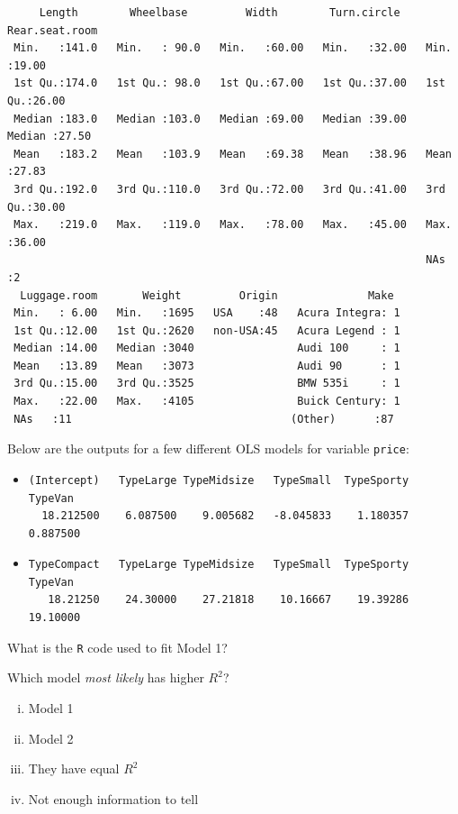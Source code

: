 \documentclass[12pt]{article}
\begin{document}
\begin{lstlisting}
     Length        Wheelbase         Width        Turn.circle    Rear.seat.room 
 Min.   :141.0   Min.   : 90.0   Min.   :60.00   Min.   :32.00   Min.   :19.00  
 1st Qu.:174.0   1st Qu.: 98.0   1st Qu.:67.00   1st Qu.:37.00   1st Qu.:26.00  
 Median :183.0   Median :103.0   Median :69.00   Median :39.00   Median :27.50  
 Mean   :183.2   Mean   :103.9   Mean   :69.38   Mean   :38.96   Mean   :27.83  
 3rd Qu.:192.0   3rd Qu.:110.0   3rd Qu.:72.00   3rd Qu.:41.00   3rd Qu.:30.00  
 Max.   :219.0   Max.   :119.0   Max.   :78.00   Max.   :45.00   Max.   :36.00  
                                                                 NAs   :2      
  Luggage.room       Weight         Origin              Make   
 Min.   : 6.00   Min.   :1695   USA    :48   Acura Integra: 1  
 1st Qu.:12.00   1st Qu.:2620   non-USA:45   Acura Legend : 1  
 Median :14.00   Median :3040                Audi 100     : 1  
 Mean   :13.89   Mean   :3073                Audi 90      : 1  
 3rd Qu.:15.00   3rd Qu.:3525                BMW 535i     : 1  
 Max.   :22.00   Max.   :4105                Buick Century: 1  
 NAs   :11                                  (Other)      :87 
\end{lstlisting}


Below are the outputs for a few different OLS models for variable \texttt{price}:

\begin{itemize}
\item[\fbox{Model 1}]

\begin{verbatim}
(Intercept)   TypeLarge TypeMidsize   TypeSmall  TypeSporty     TypeVan 
  18.212500    6.087500    9.005682   -8.045833    1.180357    0.887500 
\end{verbatim}
\item[\fbox{Model 2}]
\begin{verbatim}
TypeCompact   TypeLarge TypeMidsize   TypeSmall  TypeSporty     TypeVan 
   18.21250    24.30000    27.21818    10.16667    19.39286    19.10000
\end{verbatim}
\end{itemize}



\benum
{} What is the \texttt{R} code used to fit Model 1?

 Which model \emph{most likely} has higher $R^2$?

\begin{enumerate}[i)]
\item Model 1
\item Model 2
\item They have equal $R^2$
\item Not enough information to tell
\end{enumerate}
\end{document}

